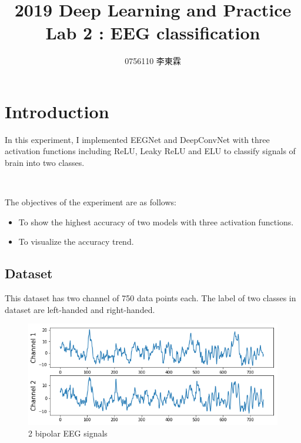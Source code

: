 \documentclass[12pt]{article}
\begin{document}
 
 
\title{2019 Deep Learning and Practice \\ Lab 2 : EEG classification}
\author{0756110 李東霖}

\maketitle
\section{Introduction}

In this experiment, I implemented EEGNet and DeepConvNet with three activation functions including ReLU, Leaky ReLU and ELU to classify signals of brain into two classes.
\par \ \par
 The objectives of the experiment are as follows:

\begin{itemize}
\item To show the highest accuracy of two models with three activation functions.
\item To visualize the accuracy trend.
\end{itemize}

\subsection{Dataset}

This dataset has two channel of 750 data points each. The label of two classes in dataset are left-handed and right-handed.

\begin{figure}
\centering
\includegraphics[scale=0.65]{Images/EEGData.png} 
\caption{2 bipolar EEG signals}
\end{figure}
\end{document}
